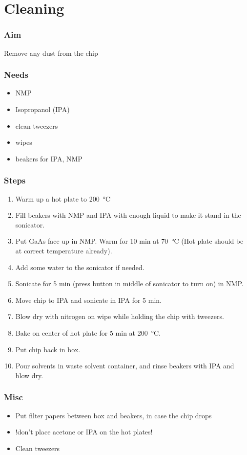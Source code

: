 \documentclass[12pt,a4paper]{report}
\begin{document}
\section{Cleaning}

\subsubsection{Aim}
Remove any dust from the chip

\subsubsection{Needs}
\begin{itemize} [noitemsep]
\item NMP
\item Isopropanol (IPA)
\item clean tweezers
\item wipes
\item beakers for IPA, NMP
\end{itemize}

\subsubsection{Steps}
\begin{enumerate}
\item Warm up a hot plate to \SI{200}{\celsius}
\item Fill beakers with NMP and IPA with enough liquid to make it stand in the sonicator.
\item Put GaAs face up in NMP. Warm for 10 min at \SI{70}{\celsius} (Hot plate should be at correct temperature already).
\item Add some water to the sonicator if needed.
\item Sonicate for 5 min (press button in middle of sonicator to turn on) in NMP.
\item Move chip to IPA and sonicate in IPA for 5 min.
\item Blow dry with nitrogen on wipe while holding the chip with tweezers.
\item Bake on center of hot plate for 5 min at \SI{200}{\celsius}.
\item Put chip back in box.
\item Pour solvents in waste solvent container, and rinse beakers with IPA and blow dry.
\end{enumerate}

\subsubsection{Misc}
\begin{itemize}
\item Put filter papers between box and beakers, in case the chip drops
\item !don't place acetone or IPA on the hot plates!
\item Clean tweezers
\end{itemize}
\end{document}
